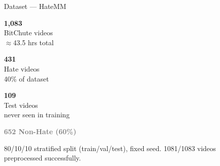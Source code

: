 \begin{minipage}[t]{0.465\textwidth}
\begin{pbox}{Dataset --- HateMM}
    \vspace{5mm}
    \noindent
    \begin{minipage}[t]{0.31\linewidth}\centering
      \colorbox{dsgray}{\begin{minipage}[c][22mm][c]{0.9\linewidth}
        \centering
        \textcolor{epflred}{\LARGE\bfseries 1{,}083}\\[1mm]
        {\normalsize BitChute videos\\$\approx$43.5 hrs total}
      \end{minipage}}
    \end{minipage}%
    \hfill
    \begin{minipage}[t]{0.31\linewidth}\centering
      \colorbox{dsgray}{\begin{minipage}[c][22mm][c]{0.9\linewidth}
        \centering
        \textcolor{epflred}{\LARGE\bfseries 431}\\[1mm]
        {\normalsize Hate videos\\40\% of dataset}
      \end{minipage}}
    \end{minipage}%
    \hfill
    \begin{minipage}[t]{0.31\linewidth}\centering
      \colorbox{dsgray}{\begin{minipage}[c][22mm][c]{0.9\linewidth}
        \centering
        \textcolor{epflred}{\LARGE\bfseries 109}\\[1mm]
        {\normalsize Test videos\\never seen in training}
      \end{minipage}}
    \end{minipage}

    \vspace{5mm}
    \noindent{\large\bfseries\textcolor{epflred}{431 Hate (40\%)}}
    \hfill
    {\large\bfseries\textcolor{gray}{652 Non-Hate (60\%)}}\\[1mm]
    \noindent{}

    \vspace{4mm}
    {\large\color{gray}
      80/10/10 stratified split (train/val/test), fixed seed.
      1081/1083 videos preprocessed successfully.}
  \end{pbox}


\end{minipage}
